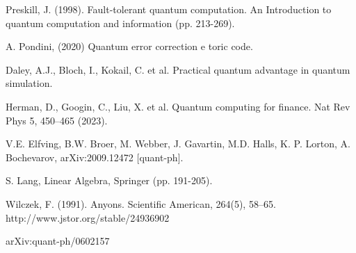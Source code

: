 \documentclass[12pt]{report}
\begin{document}
\begin{thebibliography}{99}
		 Preskill, J. (1998). Fault-tolerant quantum computation. An Introduction to quantum computation and information (pp. 213-269).
		
		 A. Pondini, (2020) Quantum error correction e toric code.
		
		 Daley, A.J., Bloch, I., Kokail, C. et al. Practical quantum advantage in quantum simulation.
		
		 Herman, D., Googin, C., Liu, X. et al. Quantum computing for finance. Nat Rev Phys 5, 450–465 (2023).
		
		 V.E. Elfving, B.W. Broer, M. Webber, J. Gavartin, M.D. Halls, K. P. Lorton, A. Bochevarov, arXiv:2009.12472 [quant-ph].
		
		 S. Lang, Linear Algebra, Springer (pp. 191-205).
		
		 Wilczek, F. (1991). Anyons. Scientific American, 264(5), 58–65. http://www.jstor.org/stable/24936902


                	arXiv:quant-ph/0602157
  
	\end{thebibliography}
	
\end{document}

